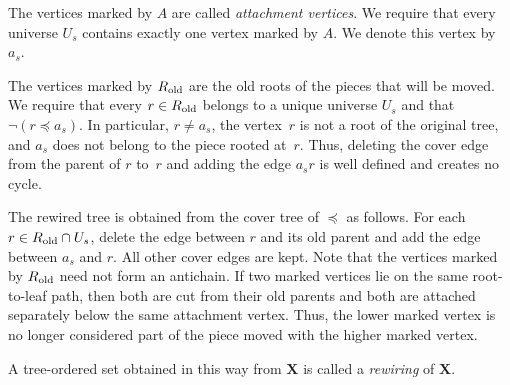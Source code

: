\documentclass[1p,number,11pt]{elsarticle}
\theoremstyle{plain}
\begin{document}
The vertices marked by $A$ are called \emph{attachment vertices}. 
We require that every universe $U_s$ contains exactly one vertex marked by $A$. 
We denote this vertex by $a_s$.

The vertices marked by $R_{\rm old}$ are the old roots of the pieces that
will be moved. We require that every $r\in R_{\rm old}$ belongs to a unique
universe $U_s$ and that $\neg(r\preceq a_s)$. In particular, $r\neq a_s$,
the vertex~$r$ is not a root of the original tree, and $a_s$ does not belong
to the piece rooted at~$r$. Thus, deleting the cover edge from the parent of
$r$ to~$r$ and adding the edge $a_sr$ is well defined and creates no cycle.

The rewired tree is obtained from the cover tree of $\preceq$ as follows. 
For each $r\in R_{\rm old}\cap U_s$, delete the edge between $r$ and its old parent and add the edge between $a_s$ and $r$. 
All other cover edges are kept.  
Note that the vertices marked by $R_{\rm old}$ need not form an antichain.  
If two marked vertices lie on the same root-to-leaf path, then both are cut from their old parents and both are attached separately below the same attachment vertex.
Thus, the lower marked vertex is no longer considered part of the piece moved with the higher marked vertex.

A tree-ordered set obtained in this way from $\mathbf X$ is called a \emph{rewiring} of $\mathbf X$.
\end{document}
